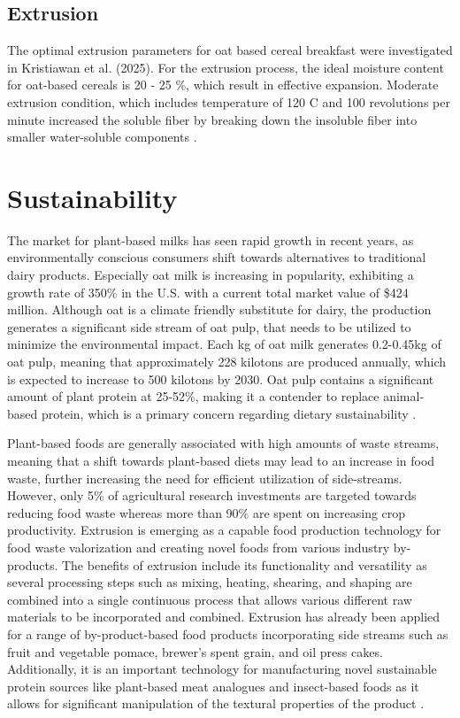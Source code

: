 \subsection*{Extrusion}
The optimal extrusion parameters for oat based cereal breakfast were investigated in Kristiawan et al. (2025). For the extrusion process, the ideal moisture content for oat-based cereals is 20 - 25 \%, which result in effective expansion. Moderate extrusion condition, which includes temperature of 120 C and 100 revolutions per minute increased the soluble fiber by breaking down the insoluble fiber into smaller water-soluble components \cite*{RM_magdalena}.

\section{Sustainability}
The market for plant-based milks has seen rapid growth in recent years, as environmentally conscious consumers shift towards alternatives to traditional dairy products. Especially oat milk is increasing in popularity, exhibiting a growth rate of 350\% in the U.S. with a current total market value of \$424 million. Although oat is a climate friendly substitute for dairy, the production generates a significant side stream of oat pulp, that needs to be utilized to minimize the environmental impact. Each kg of oat milk generates 0.2-0.45kg of oat pulp, meaning that approximately 228 kilotons are produced annually, which is expected to increase to 500 kilotons by 2030. Oat pulp contains a significant amount of plant protein at 25-52\%, making it a contender to replace animal-based protein, which is a primary concern regarding dietary sustainability \cite*{05_article}.

\vline

Plant-based foods are generally associated with high amounts of waste streams, meaning that a shift towards plant-based diets may lead to an increase in food waste, further increasing the need for efficient utilization of side-streams. However, only 5\% of agricultural research investments are targeted towards reducing food waste whereas more than 90\% are spent on increasing crop productivity. Extrusion is emerging as a capable food production technology for food waste valorization and creating novel foods from various industry by-products. The benefits of extrusion include its functionality and versatility as several processing steps such as mixing, heating, shearing, and shaping are combined into a single continuous process that allows various different raw materials to be incorporated and combined. Extrusion has already been applied for a range of by-product-based food products incorporating side streams such as fruit and vegetable pomace, brewer's spent grain, and oil press cakes. Additionally, it is an important technology for manufacturing novel sustainable protein sources like plant-based meat analogues and insect-based foods as it allows for significant manipulation of the textural properties of the product \cite*{06_article}.

